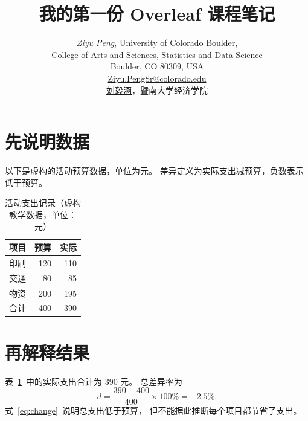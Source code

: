 \documentclass[UTF8,a4paper,fontset=fandol]{ctexart}
\title{我的第一份 Overleaf 课程笔记}
\author{\href{https://github.com/pzy54154631-hub}{\textit{Ziyu Peng}}, University of Colorado Boulder,
  \\[0.1em]College of Arts and Sciences, Statistics and Data Science
  \\[0.1em]Boulder, CO 80309, USA
  \\[0.1em]\href{mailto:Ziyu.PengSr@colorado.edu}{Ziyu.PengSr@colorado.edu}
  \\[0.35em]
  \href{https://pzy54154631-hub.github.io/liuyihan/}{刘毅涵}，暨南大学经济学院}
\date{}
\begin{document}
\maketitle

\section{先说明数据}
以下是虚构的活动预算数据，单位为元。
差异定义为实际支出减预算，负数表示低于预算。

\begin{table}[htbp]
\centering
\caption{活动支出记录（虚构教学数据，单位：元）}
\label{tab:expense}
\begin{tabular}{@{}lrr@{}}
\toprule
项目 & 预算 & 实际 \\
\midrule
印刷 & 120 & 110 \\
交通 & 80 & 85 \\
物资 & 200 & 195 \\
\midrule
合计 & 400 & 390 \\
\bottomrule
\end{tabular}
\end{table}

\section{再解释结果}
表~\ref{tab:expense}~中的实际支出合计为 390 元。
总差异率为
\begin{equation}
  d=\frac{390-400}{400}\times100\%=-2.5\%.
  \label{eq:change}
\end{equation}
式~\eqref{eq:change}~说明总支出低于预算，
但不能据此推断每个项目都节省了支出。
\end{document}
